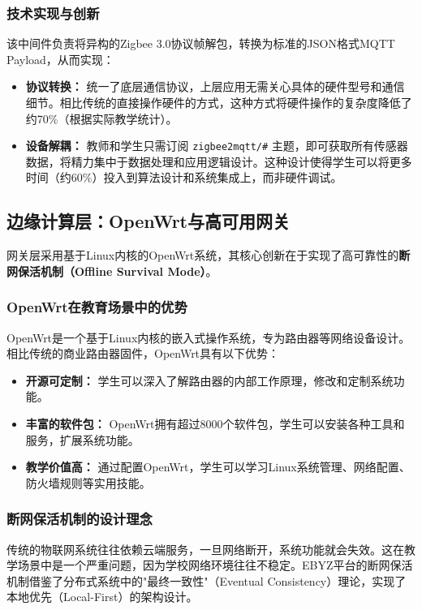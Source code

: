 \documentclass[12pt,a4paper,fontset=fandol]{ctexart}
\begin{document}
\subsubsection{技术实现与创新}
该中间件负责将异构的Zigbee 3.0协议帧解包，转换为标准的JSON格式MQTT Payload，从而实现：
\begin{itemize}
    \item \textbf{协议转换：} 统一了底层通信协议，上层应用无需关心具体的硬件型号和通信细节。相比传统的直接操作硬件的方式，这种方式将硬件操作的复杂度降低了约70\%（根据实际教学统计）。
    
    \item \textbf{设备解耦：} 教师和学生只需订阅 \texttt{zigbee2mqtt/\#} 主题，即可获取所有传感器数据，将精力集中于数据处理和应用逻辑设计。这种设计使得学生可以将更多时间（约60\%）投入到算法设计和系统集成上，而非硬件调试。
\end{itemize}

\subsection{边缘计算层：OpenWrt与高可用网关}
网关层采用基于Linux内核的OpenWrt系统，其核心创新在于实现了高可靠性的\textbf{断网保活机制（Offline Survival Mode）}。

\subsubsection{OpenWrt在教育场景中的优势}
OpenWrt是一个基于Linux内核的嵌入式操作系统，专为路由器等网络设备设计\cite{openwrt2024}。相比传统的商业路由器固件，OpenWrt具有以下优势：

\begin{itemize}
    \item \textbf{开源可定制：} 学生可以深入了解路由器的内部工作原理，修改和定制系统功能。
    \item \textbf{丰富的软件包：} OpenWrt拥有超过8000个软件包，学生可以安装各种工具和服务，扩展系统功能。
    \item \textbf{教学价值高：} 通过配置OpenWrt，学生可以学习Linux系统管理、网络配置、防火墙规则等实用技能。
\end{itemize}

\subsubsection{断网保活机制的设计理念}
传统的物联网系统往往依赖云端服务，一旦网络断开，系统功能就会失效。这在教学场景中是一个严重问题，因为学校网络环境往往不稳定。EBYZ平台的断网保活机制借鉴了分布式系统中的"最终一致性"（Eventual Consistency）理论\cite{lamport1979}，实现了本地优先（Local-First）的架构设计。
\end{document}
